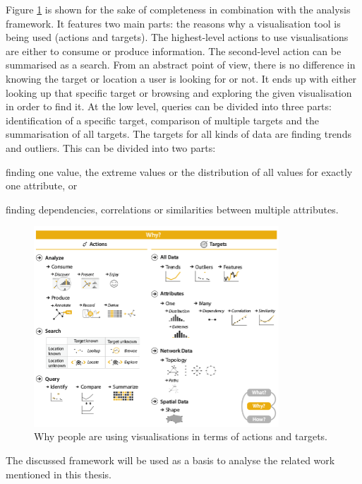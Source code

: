 Figure \ref{fig:why} is shown for the sake of completeness in combination with the analysis framework. It features two main parts: the reasons why a visualisation tool is being used (actions and targets). The highest-level actions to use visualisations are either to consume or produce information. The second-level action can be summarised as a search. From an abstract point of view, there is no difference in knowing the target or location a user is looking for or not. It ends up with either looking up that specific target or browsing and exploring the given visualisation in order to find it. At the low level, queries can be divided into three parts: identification of a specific target, comparison of multiple targets and the summarisation of all targets.
The targets for all kinds of data are finding trends and outliers. This can be divided into two parts:
\begin{enumerate*}[label={(\arabic*)}]
\item finding one value, the extreme values or the distribution of all values for exactly one attribute, or
\item finding dependencies, correlations or similarities between multiple attributes.
\end{enumerate*}

\begin{figure}[!htb]
\centering
\includegraphics[height=7.5cm,keepaspectratio]{images/basics/why.png}
\caption[
    Why people are using visualisations in terms of actions and targets .
]{Why people are using visualisations in terms of actions and targets.}
\label{fig:why}
\end{figure}

The discussed framework will be used as a basis to analyse the related work mentioned in this thesis.

